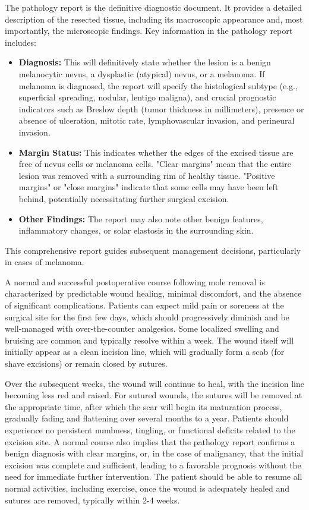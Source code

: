 The pathology report is the definitive diagnostic document. It provides a detailed description of the resected tissue, including its macroscopic appearance and, most importantly, the microscopic findings. Key information in the pathology report includes:

\begin{itemize}
  \item \textbf{Diagnosis:} This will definitively state whether the lesion is a benign melanocytic nevus, a dysplastic (atypical) nevus, or a melanoma. If melanoma is diagnosed, the report will specify the histological subtype (e.g., superficial spreading, nodular, lentigo maligna), and crucial prognostic indicators such as Breslow depth (tumor thickness in millimeters), presence or absence of ulceration, mitotic rate, lymphovascular invasion, and perineural invasion.
  
  \item \textbf{Margin Status:} This indicates whether the edges of the excised tissue are free of nevus cells or melanoma cells. "Clear margins" mean that the entire lesion was removed with a surrounding rim of healthy tissue. "Positive margins" or "close margins" indicate that some cells may have been left behind, potentially necessitating further surgical excision.
  
  \item \textbf{Other Findings:} The report may also note other benign features, inflammatory changes, or solar elastosis in the surrounding skin.
\end{itemize}

This comprehensive report guides subsequent management decisions, particularly in cases of melanoma.

A normal and successful postoperative course following mole removal is characterized by predictable wound healing, minimal discomfort, and the absence of significant complications. Patients can expect mild pain or soreness at the surgical site for the first few days, which should progressively diminish and be well-managed with over-the-counter analgesics. Some localized swelling and bruising are common and typically resolve within a week. The wound itself will initially appear as a clean incision line, which will gradually form a scab (for shave excisions) or remain closed by sutures.

Over the subsequent weeks, the wound will continue to heal, with the incision line becoming less red and raised. For sutured wounds, the sutures will be removed at the appropriate time, after which the scar will begin its maturation process, gradually fading and flattening over several months to a year. Patients should experience no persistent numbness, tingling, or functional deficits related to the excision site. A normal course also implies that the pathology report confirms a benign diagnosis with clear margins, or, in the case of malignancy, that the initial excision was complete and sufficient, leading to a favorable prognosis without the need for immediate further intervention. The patient should be able to resume all normal activities, including exercise, once the wound is adequately healed and sutures are removed, typically within 2-4 weeks.

